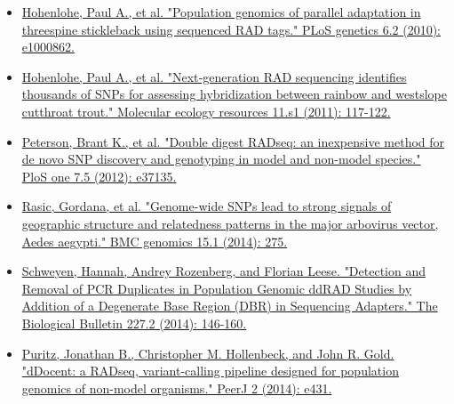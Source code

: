 \documentclass[11pt]{article}
\begin{document}
\begin{itemize}
\item \href{http://journals.plos.org/plosgenetics/article?id=10.1371/journal.pgen.1000862}{Hohenlohe, Paul A., et al. "Population genomics of parallel adaptation in threespine stickleback using sequenced RAD tags." PLoS genetics 6.2 (2010): e1000862.}
\end{itemize}


\begin{itemize}
\item \href{http://onlinelibrary.wiley.com/doi/10.1111/j.1755-0998.2010.02967.x/abstract?deniedAccessCustomisedMessage=&userIsAuthenticated=false}{Hohenlohe, Paul A., et al. "Next‐generation RAD sequencing identifies thousands of SNPs for assessing hybridization between rainbow and westslope cutthroat trout." Molecular ecology resources 11.s1 (2011): 117-122.}
\end{itemize}


\begin{itemize}
\item \href{http://journals.plos.org/plosone/article?id=10.1371/journal.pone.0037135#pone-0037135-g005}{Peterson, Brant K., et al. "Double digest RADseq: an inexpensive method for de novo SNP discovery and genotyping in model and non-model species." PloS one 7.5 (2012): e37135.}
\end{itemize}


\begin{itemize}
\item \href{http://www.biomedcentral.com/1471-2164/15/275}{Rasic, Gordana, et al. "Genome-wide SNPs lead to strong signals of geographic structure and relatedness patterns in the major arbovirus vector, Aedes aegypti." BMC genomics 15.1 (2014): 275.}
\end{itemize}


\begin{itemize}
\item \href{http://www.biolbull.org/content/227/2/146.short}{Schweyen, Hannah, Andrey Rozenberg, and Florian Leese. "Detection and Removal of PCR Duplicates in Population Genomic ddRAD Studies by Addition of a Degenerate Base Region (DBR) in Sequencing Adapters." The Biological Bulletin 227.2 (2014): 146-160.}
\end{itemize}


\begin{itemize}
\item \href{https://peerj.com/articles/431/}{Puritz, Jonathan B., Christopher M. Hollenbeck, and John R. Gold. "dDocent: a RADseq, variant-calling pipeline designed for population genomics of non-model organisms." PeerJ 2 (2014): e431.}
\end{itemize}
\end{document}
